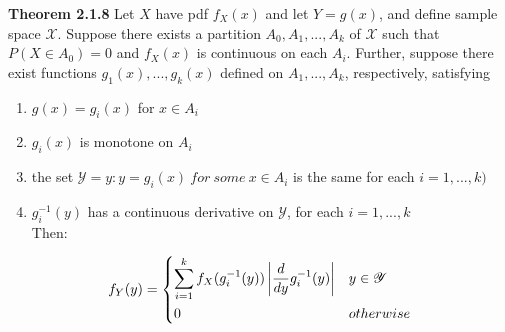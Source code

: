 \documentclass[14pt, oneside, letterpaper]{notes}
\begin{document}
\begin{remark}
	\textbf{Theorem 2.1.8} Let $X$ have pdf $f_X(x)$ and let $Y = g(x)$, 
	and define sample space $\mathscr{X}$.  Suppose there exists a 
	partition $A_0, A_1, ..., A_k$ of $\mathscr{X}$ such that
	$P(X \in A_0)=0$ and $f_X(x)$ is continuous on each $A_i$.  Further,
	suppose there exist functions $g_1(x),...,g_k(x)$ defined on 
	$A_1,...,A_k$, respectively, satisfying
	\begin{enumerate}
		\item $g(x) = g_i(x)$ for $x \in A_i$
		\item $g_i(x)$ is monotone on $A_i$
		\item the set $\mathscr{Y} = {y: y=g_i(x) \: for 
		\: some \: x \in A_i}$
		is the same for each $i=1,...,k)$
		\item $g_i^{-1}(y)$ has a continuous derivative on $\mathscr{Y}$,
		for each $i=1,...,k$ \\
		Then:
	\end{enumerate}
	\[ f_Y(y) =  
		\begin{dcases}
			\sum_{i=1}^{k}f_X(g_i^{-1}(y)) \left| 
			\frac{d}{dy}g_i^{-1}(y)\right| 
			& y \in \mathscr{Y} \\
			0 & otherwise
		\end{dcases}	
	\]
	
\end{remark}
\end{document}
